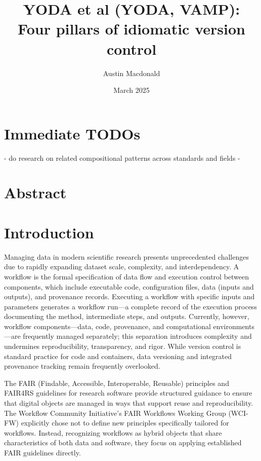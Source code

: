 \documentclass{article}
\title{YODA et al (YODA, VAMP): Four pillars of idiomatic version control}
\author{Austin Macdonald}
\date{March 2025}
\begin{document}
\maketitle

\section{Immediate TODOs}

- do research on related compositional patterns across standards and fields
- 

\section{Abstract}


\section{Introduction}

Managing data in modern scientific research presents unprecedented challenges due to rapidly expanding dataset scale, complexity, and interdependency.
A workflow is the formal specification of data flow and execution control between components, which include executable code, configuration files, data (inputs and outputs), and provenance records.
Executing a workflow with specific inputs and parameters generates a workflow run—a complete record of the execution process documenting the method, intermediate steps, and outputs.
Currently, however, workflow components—data, code, provenance, and computational environments—are frequently managed separately; this separation introduces complexity and undermines reproducibility, transparency, and rigor.
While version control is standard practice for code and containers, data versioning and integrated provenance tracking remain frequently overlooked.

The FAIR (Findable, Accessible, Interoperable, Reusable) principles and FAIR4RS guidelines for research software provide structured guidance to ensure that digital objects are managed in ways that support reuse and reproducibility.
The Workflow Community Initiative’s FAIR Workflows Working Group (WCI-FW) explicitly chose not to define new principles specifically tailored for workflows.
Instead, recognizing workflows as hybrid objects that share characteristics of both data and software, they focus on applying established FAIR guidelines directly.
\end{document}
